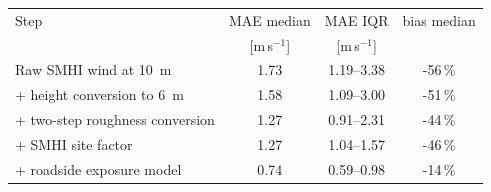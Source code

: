 \begin{tabular}{lccc}
\toprule
Step & MAE median & MAE IQR & bias median \\
 & [m\,s$^{-1}$] & [m\,s$^{-1}$] & \\
\midrule
Raw SMHI wind at \SI{10}{m} & 1.73 & 1.19--3.38 & -56\,\% \\
+ height conversion to \SI{6}{m} & 1.58 & 1.09--3.00 & -51\,\% \\
+ two-step roughness conversion & 1.27 & 0.91--2.31 & -44\,\% \\
+ SMHI site factor & 1.27 & 1.04--1.57 & -46\,\% \\
+ roadside exposure model & 0.74 & 0.59--0.98 & -14\,\% \\
\bottomrule
\end{tabular}
